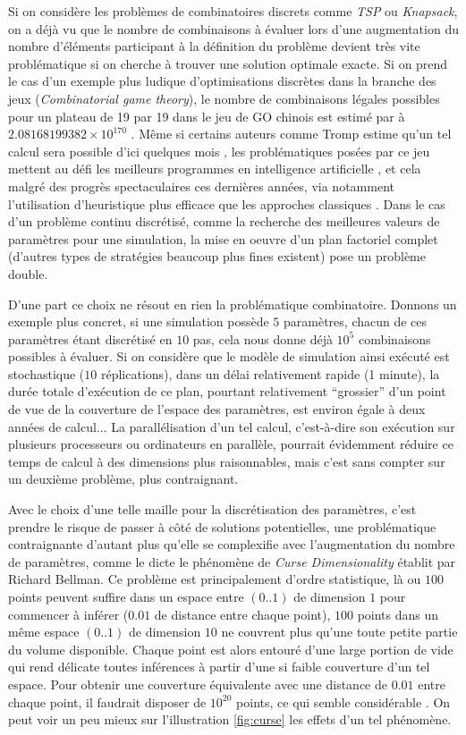 Si on considère les problèmes de combinatoires discrets comme \textit{TSP} ou \textit{Knapsack}, on a déjà vu que le nombre de combinaisons à évaluer lors d'une augmentation du nombre d'éléments participant à la définition du problème devient très vite problématique si on cherche à trouver une solution optimale exacte. Si on prend le cas d'un exemple plus ludique d'optimisations discrètes dans la branche des jeux (\textit{Combinatorial game theory}), le nombre de combinaisons légales possibles pour un plateau de 19 par 19 dans le jeu de GO chinois est estimé par \textcite{Tromp2007} à $2.08168199382×10^{170}$ . Même si certains auteurs comme Tromp estime qu'un tel calcul sera possible d'ici quelques mois , les problématiques posées par ce jeu mettent au défi les meilleurs programmes en intelligence artificielle \autocite{Bouzi2001}, et cela malgré des progrès spectaculaires ces dernières années, via notamment l'utilisation d'heuristique plus efficace que les approches classiques .  Dans le cas d'un problème continu discrétisé, comme la recherche des meilleures valeurs de paramètres pour une simulation, la mise en oeuvre d'un plan factoriel complet (d'autres types de stratégies beaucoup plus fines existent) pose un problème double.

D'une part ce choix ne résout en rien la problématique combinatoire. Donnons un exemple plus concret, si une simulation possède $5$ paramètres, chacun de ces paramètres étant discrétisé en $10$ pas, cela nous donne déjà $10^5$ combinaisons possibles à évaluer. Si on considère que le modèle de simulation ainsi exécuté est stochastique ($10$ réplications), dans un délai relativement rapide (1 minute), la durée totale d'exécution de ce plan, pourtant relativement \enquote{grossier} d'un point de vue de la couverture de l'espace des paramètres, est environ égale à deux années de calcul... La parallélisation d'un tel calcul, c'est-à-dire son exécution sur plusieurs processeurs ou ordinateurs en parallèle, pourrait évidemment réduire ce temps de calcul à des dimensions plus raisonnables, mais c'est sans compter sur un deuxième problème, plus contraignant.

Avec le choix d'une telle maille pour la discrétisation des paramètres, c'est prendre le risque de passer à côté de solutions potentielles, une problématique contraignante d'autant plus qu'elle se complexifie avec l'augmentation du nombre de paramètres, comme le dicte le phénomène de \textit{Curse Dimensionality} établit par Richard Bellman. Ce problème est principalement d'ordre statistique, là ou $100$ points peuvent suffire dans un espace entre $(0..1)$ de dimension $1$ pour commencer à inférer ($0.01$ de distance entre chaque point), $100$ points dans un même espace $(0..1)$ de dimension $10$ ne couvrent plus qu'une toute petite partie du volume disponible. Chaque point est alors entouré d'une large portion de vide qui rend délicate toutes inférences à partir d'une si faible couverture d'un tel espace. Pour obtenir une couverture équivalente avec une distance de $0.01$ entre chaque point, il faudrait disposer de $10^{20}$ points, ce qui semble considérable \autocite{Bellman1961}. On peut voir un peu mieux sur l'illustration \ref{fig:curse} les effets d'un tel phénomène.

